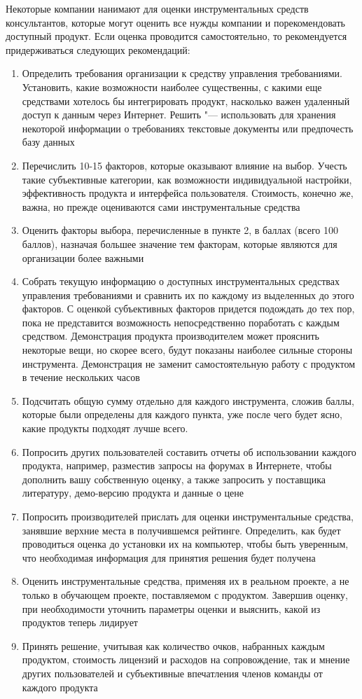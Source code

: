 \documentclass{../industrial-development}
\begin{document}
\lecturenotes

Некоторые компании нанимают для оценки инструментальных средств консультантов, которые могут оценить все нужды компании и порекомендовать доступный продукт. Если оценка проводится самостоятельно, то рекомендуется придерживаться следующих рекомендаций:
	\begin{enumerate}
\item Определить требования организации к средству управления требованиями. Установить, какие возможности наиболее существенны, с какими еще средствами хотелось бы интегрировать продукт, насколько важен удаленный доступ к данным через Интернет. Решить "--- использовать для хранения некоторой информации о требованиях текстовые документы или предпочесть базу данных
\item Перечислить 10-15 факторов, которые оказывают влияние на выбор. Учесть такие субъективные категории, как возможности индивидуальной настройки, эффективность продукта и интерфейса пользователя. Стоимость, конечно же, важна, но прежде оцениваются сами инструментальные средства
\item Оценить факторы выбора, перечисленные в пункте 2, в баллах (всего 100 баллов), назначая большее значение тем факторам, которые являются для организации более важными
\item Собрать текущую информацию о доступных инструментальных средствах управления требованиями и сравнить их по каждому из выделенных до этого факторов. С оценкой субъективных факторов придется подождать до тех пор, пока не представится возможность непосредственно поработать с каждым средством. Демонстрация продукта производителем может прояснить некоторые вещи, но скорее всего, будут показаны наиболее сильные стороны инструмента. Демонстрация не заменит самостоятельную работу с продуктом в течение нескольких часов
\item Подсчитать общую сумму отдельно для каждого инструмента, сложив баллы, которые были определены для каждого пункта, уже после чего будет ясно, какие продукты подходят лучше всего.
\item Попросить других пользователей составить отчеты об использовании каждого продукта, например, разместив запросы на форумах в Интернете, чтобы дополнить вашу собственную оценку, а также запросить у поставщика литературу, демо-версию продукта и данные о цене
\item Попросить производителей прислать для оценки инструментальные средства, занявшие верхние места в получившемся рейтинге. Определить, как будет проводиться оценка до установки их на компьютер, чтобы быть уверенным, что необходимая информация для принятия решения будет получена
\item Оценить инструментальные средства, применяя их в реальном проекте, а не только в обучающем проекте, поставляемом с продуктом. Завершив оценку, при необходимости уточнить параметры оценки и выяснить, какой из продуктов теперь лидирует
\item Принять решение, учитывая как количество очков, набранных каждым продуктом, стоимость лицензий и расходов на сопровождение, так и мнение других пользователей и субъективные впечатления членов команды от каждого продукта~\cite[с.~408--409]{Wiegers}
  	\end{enumerate}
\end{document}
